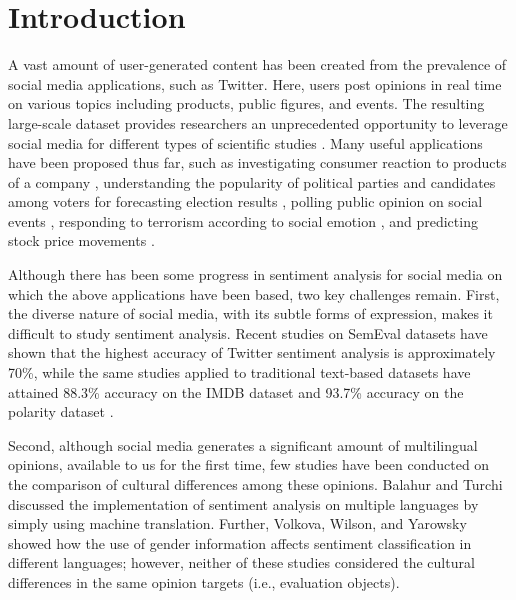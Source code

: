 \documentclass[english]{jnlp_1.4}
\begin{document}
\maketitle

\clearpage
\section{Introduction}

A vast amount of user-generated content has been created from the prevalence of social media applications, such as Twitter. Here, users post opinions in real time on various topics including products, public figures, and events. The resulting large-scale dataset provides researchers an unprecedented opportunity to leverage social media for different types of scientific studies \cite{Liu12}. Many useful applications have been proposed thus far, such as investigating consumer reaction to products of a company \cite{Jansen09}, understanding the popularity of political parties and candidates among voters for forecasting election results \cite{Tumasjan11}, polling public opinion on social events \cite{Brendan10}, responding to terrorism according to social emotion \cite{Cheong11}, and predicting stock price movements \cite{Lu15}.

Although there has been some progress in sentiment analysis for social media on which the above applications have been based, two key challenges remain. First, the diverse nature of social media, with its subtle forms of expression, makes it difficult to study sentiment analysis. Recent studies on SemEval datasets \cite{Nakov13,Santos14,Xiang14} have shown that the highest accuracy of Twitter sentiment analysis is approximately 70\%, while the same studies applied to traditional text-based datasets have attained 88.3\% accuracy on the IMDB dataset and 93.7\% accuracy on the polarity dataset \cite{Tang09}.

Second, although social media generates a significant amount of multilingual opinions, available to us for the first time, few studies have been conducted on the comparison of cultural differences among these opinions. Balahur and Turchi \citeyear{Balahur13} discussed the implementation of sentiment analysis on multiple languages by simply using machine translation. Further, Volkova, Wilson, and Yarowsky \citeyear{Volkova13} showed how the use of gender information affects sentiment classification in different languages; however, neither of these studies considered the cultural differences in the same opinion targets (i.e., evaluation objects).
\end{document}
